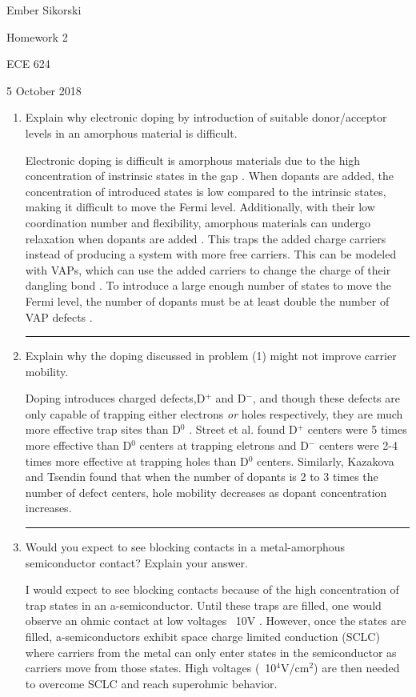 \documentclass[12pt]{elsarticle}
\newcommand{\vs}{\vspace{2mm}}
\newcommand{\fullline}{\noindent\rule{14cm}{0.4pt} \vspace{4mm}}
\begin{document}
\begin{flushright}
	Ember Sikorski\par
	Homework 2\par
	ECE 624\par 
	5 October 2018
\end{flushright}


\begin{enumerate}
\item Explain why electronic doping by introduction of suitable donor/acceptor levels in an amorphous material is difficult. \par \vs
Electronic doping is difficult is amorphous materials due to the high concentration of instrinsic states in the gap \cite{Tauc1976}. When dopants are added, the concentration of introduced states is low compared to the intrinsic states, making it difficult to move the Fermi level. Additionally, with their low coordination number and flexibility, amorphous materials can undergo relaxation when dopants are added \cite{Kim2015}. This traps the added charge carriers instead of producing a system with more free carriers. This can be modeled with VAPs, which can use the added carriers to change the charge of their dangling bond \cite{Fritzsche2007}. To introduce a large enough number of states to move the Fermi level, the  number of dopants must be at least double the number of VAP defects \cite{Fritzsche2007}.

\fullline
\item Explain why the doping discussed in problem (1) might not improve carrier mobility. \par \vs
Doping introduces charged defects,D$^{+}$ and D$^{-}$, and though these defects are only capable of trapping either electrons \emph{or} holes respectively,  they are much more effective trap sites than D$^{0}$ \cite{Street1983}. Street et al. found D$^{+}$ centers were 5 times more effective than D$^{0}$ centers at trapping eletrons and D$^{-}$ centers were 2-4 times more effective at trapping holes than D$^{0}$ centers. Similarly, Kazakova and Tsendin \cite{Kazakova1999} found that when the number of dopants is 2 to 3 times the number of defect centers, hole mobility decreases as dopant concentration increases.
\fullline
\item Would you expect to see blocking contacts in a metal-amorphous semiconductor contact? Explain your answer. \par \vs 
I would expect to see blocking contacts because of the high concentration of trap states in an a-semiconductor. Until these traps are filled, one would observe an ohmic contact at low voltages ~10V \cite{Singh2006}. However, once the states are filled, a-semiconductors exhibit space charge limited conduction (SCLC) \cite{Singh2006,Kushwaha2006,MajeedKhan2003} where carriers from the metal can only enter states in the semiconductor as carriers move from those states. High voltages (~10$^{4}$V/cm$^2$) are then needed to overcome SCLC and reach superohmic behavior\cite{Singh2006,Kushwaha2006}.


\end{enumerate}
\end{document}
